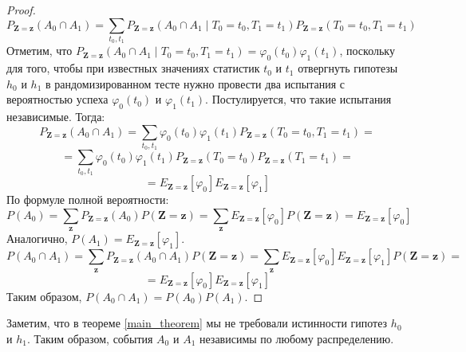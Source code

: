 \begin{proof}
    $$
    P_{\mathbf{Z=z}}(A_0 \cap A_1)
    =\sum_{t_0,t_1} P_{\mathbf{Z=z}}(A_0 \cap A_1 \mid T_0=t_0, T_1=t_1)P_{\mathbf{Z=z}}(T_0=t_0, T_1=t_1)
    $$
    Отметим, что $P_{\mathbf{Z=z}}(A_0 \cap A_1 \mid T_0=t_0, T_1=t_1)=\varphi_0(t_0)\varphi_1(t_1)$, поскольку
    для того, чтобы при известных значениях статистик $t_0$ и $t_1$ отвергнуть гипотезы $h_0$ и $h_1$ в рандомизированном тесте нужно провести два испытания с вероятностью успеха
    $\varphi_0(t_0)$ и $\varphi_1(t_1)$. Постулируется, что такие испытания независимые. Тогда:
    $$
    P_{\mathbf{Z=z}}(A_0 \cap A_1)=\sum_{t_0,t_1} \varphi_0(t_0) \varphi_1(t_1) P_{\mathbf{Z=z}}(T_0=t_0, T_1=t_1)=
    $$
    $$
    =\sum_{t_0,t_1} \varphi_0(t_0) \varphi_1(t_1) P_{\mathbf{Z=z}}(T_0=t_0)P_{\mathbf{Z=z}}(T_1=t_1)=
    $$
    $$
    =E_{\mathbf{Z=z}}[\varphi_0] E_{\mathbf{Z=z}}[\varphi_1]
    $$
    По формуле полной вероятности:
    $$
    P(A_0) = \sum_{\mathbf{z}} P_{\mathbf{Z=z}}(A_0) P(\mathbf{Z}=\mathbf{z})
    = \sum_{\mathbf{z}} E_{\mathbf{Z=z}}[\varphi_0] P(\mathbf{Z}=\mathbf{z}) = E_{\mathbf{Z=z}}[\varphi_0]
    $$
    Аналогично, $P(A_1)=E_{\mathbf{Z=z}}[\varphi_1]$.
    $$
    P(A_0 \cap A_1) = \sum_{\mathbf{z}} P_{\mathbf{Z=z}}(A_0 \cap A_1) P(\mathbf{Z}=\mathbf{z})
    = \sum_{\mathbf{z}} E_{\mathbf{Z=z}}[\varphi_0] E_{\mathbf{Z=z}}[\varphi_1] P(\mathbf{Z}=\mathbf{z}) =
    $$
    $$
    = E_{\mathbf{Z=z}}[\varphi_0] E_{\mathbf{Z=z}}[\varphi_1]
    $$
    Таким образом, $P(A_0 \cap A_1)=P(A_0) P(A_1)$.
\end{proof}

Заметим, что в теореме \ref{main_theorem} мы не требовали истинности
гипотез $h_0$ и $h_1$. Таким образом, события $A_0$ и $A_1$ независимы
по любому распределению.